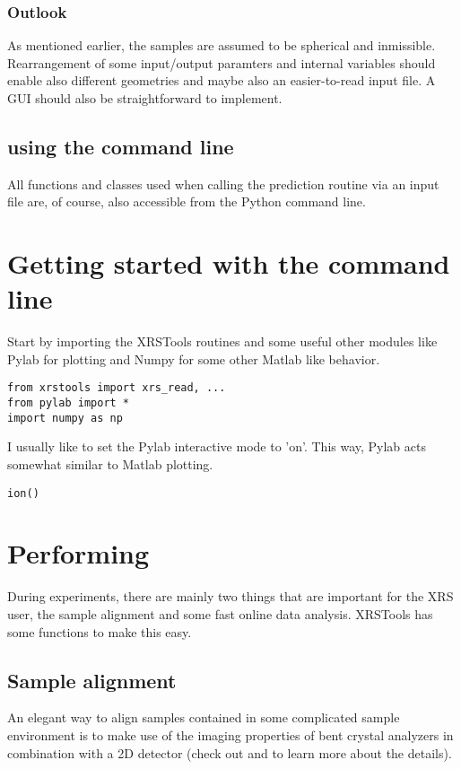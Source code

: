 \documentclass[aps,prl,groupedaddress]{revtex4}
\begin{document}
\subsubsection{Outlook}
As mentioned earlier, the samples are assumed to be spherical and inmissible. Rearrangement of some input/output paramters and internal variables should enable also different geometries and maybe also an easier-to-read input file. A GUI should also be straightforward to implement.


\subsection{using the command line}
All functions and classes used when calling the prediction routine via an input file are, of course, also accessible from the Python command line.

\section{Getting started with the command line}
Start by importing the XRSTools routines and some useful other modules like Pylab for plotting and Numpy for some other Matlab like behavior.
\lstset{language=Python, breaklines=true}
\begin{lstlisting}[frame=single]
from xrstools import xrs_read, ...
from pylab import *
import numpy as np
\end{lstlisting}

I usually like to set the Pylab interactive mode to 'on'. This way, Pylab acts somewhat similar to Matlab plotting.
\lstset{language=Python, breaklines=true}
\begin{lstlisting}[frame=single]
ion()
\end{lstlisting}

\section{Performing}
During experiments, there are mainly two things that are important for the XRS user, the sample alignment and some fast online data analysis. XRSTools has some functions to make this easy. 

\subsection{Sample alignment}
An elegant way to align samples contained in some complicated sample environment is to make use of the imaging properties of bent crystal analyzers in combination with a 2D detector (check out \cite{SHuotari2011} and \cite{XRSTools_paper} to learn more about the details).
\end{document}
